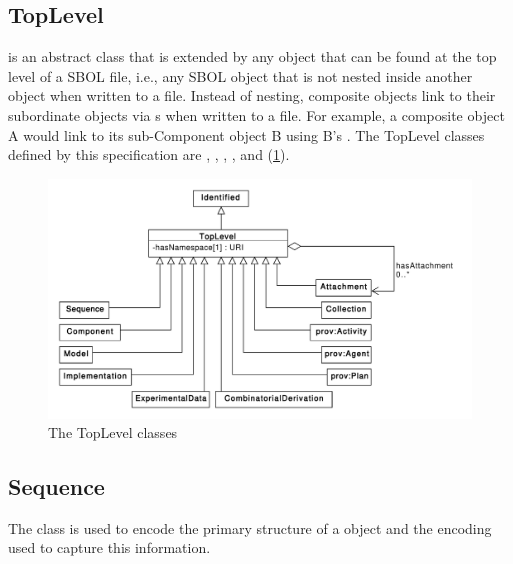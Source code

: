 \subsection {TopLevel}
\label{sec:TopLevel}
 is an abstract class that is extended by any  object that can be found at the top level of a SBOL file, i.e., any SBOL object that is not nested inside another object when written to a file. Instead of nesting, composite  objects link to their subordinate  objects via s when written to a file. For example, a composite  object A would link to its sub-Component object B using B's . The TopLevel classes defined by this specification are , , , ,  and  (\ref{uml:toplevel}).

\begin{figure}[ht]
\begin{center}
\includegraphics[width=\textwidth]{uml/toplevel}
\caption[]{The TopLevel classes}
\label{uml:toplevel}
\end{center}
\end{figure}




\subsection{Sequence}
\label{sec:Sequence}
The  class is used to encode the primary structure of a  object and the encoding used to capture this information.


